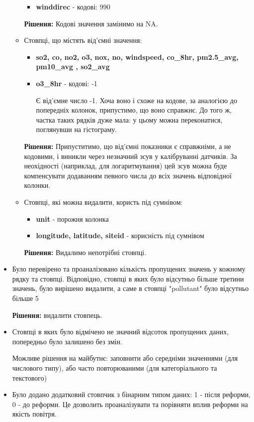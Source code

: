 \documentclass[./report.tex]{subfiles}
\begin{document}
\begin{itemize}
\begin{itemize}
\begin{itemize}
          \item \textbf{winddirec} - кодові: 990
        \end{itemize}

        \textbf{Рішення:} Кодові значення замінимо на NA.

        \item Стовпці, що містять від'ємні значення:

        \begin{itemize}
          \item \textbf{so2, co, no2,  o3, nox, no, windspeed, co\_8hr, pm2.5\_avg, pm10\_avg , so2\_avg}

          \item \textbf{o3\_8hr} - кодові: -1

          Є від'ємне число -1. Хоча воно і схоже на кодове, за аналогією до попередніх колонок,
          припустимо, що воно справжнє. До того ж, частка таких рядків дуже мала: у цьому можна
          переконатися, поглянувши на гістограму.
        \end{itemize}

        \textbf{Рішення:} Припуститимо, що від'ємні показники є справжніми, а не кодовими, і
        виникли через незначний зсув у калібруванні датчиків.
        За неохідності (наприклад, для логаритмування) цей зсув можна буде компенсувати
        додаванням певного числа до всіх значень відповідної колонки.

        \item Стовпці, які можна видалити, користь під сумнівом:

        \begin{itemize}
          \item \textbf{unit} - порожня колонка
          \item \textbf{longitude, latitude, siteid} - корисність під сумнівом
        \end{itemize}

        \textbf{Рішення:} Видалимо непотрібні стовпці.
      \end{itemize}

  \item Було перевірено та проаналізовано кількість пропущених значень у кожному рядку та стовпці.
  Відповідно, стовпці в яких було відсутньо більше третини значень, було вирішено видалити,
  а саме в стовпці "pollutant" було відсутньо більше 5%

  \textbf{Рішення:} видалити стовпець.

  \item Стовпці в яких було відмічено не значний відсоток пропущених даних,
  попередньо було залишено без змін.

  Можливе рішення на майбутнє: заповнити або середніми значеннями (для числового типу),
  або часто повторюваними (для категоріального та текстового)

  \item Було додано додатковий стовпчик з бінарним типом даних: 1 - після реформи, 0 - до реформи.
  Це дозволить проаналізувати та порівняти вплив реформи на якість повітря.
\end{itemize}
\end{document}
